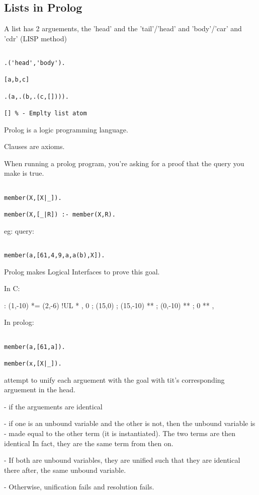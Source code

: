 \documentclass[a4paper,12pt]{article}
\begin{document}
\subsection{Lists in Prolog}

A list has 2 arguements, the 'head' and the 'tail'/'head' and 'body'/'car' and 'cdr' (LISP method) \\

\begin{verbatim}

.('head','body').

[a,b,c]

.(a,.(b,.(c,[]))).

[] % - Emplty list atom

\end{verbatim}

Prolog is a logic programming language.

Clauses are axioms.

When running a prolog program, you're asking for a proof that the query you make is true.

\begin{verbatim}

member(X,[X|_]).

member(X,[_|R]) :- member(X,R).

\end{verbatim}

eg: query:


\begin{verbatim}

member(a,[61,4,9,a,a(b),X]).

\end{verbatim}

Prolog makes Logical Interfaces to prove this goal.


In C:


\xy <1cm,0cm>:
(1,-10) *= (2,-6) !UL\txt{} *\frm{-} ,
0 ; (15,0) ; (15,-10) **\dir{-} ;
(0,-10) **\dir{-} ;
0 **\dir{-} ,
\endxy


In prolog:

\begin{verbatim}

member(a,[61,a]).
   
member(x,[X|_]).

\end{verbatim}

attempt to unify each arguement with the goal with tit's corresponding arguement in the head.

	- if the arguements are identical
	
	- if one is an unbound variable and the other is not, then the unbound variable is 
	- made equal to the other term (it is instantiated). The two terms are then identical
	  In fact, they are the same term from then on.

	- If both are unbound variables, they are unified such that they are identical there after,
	  the same unbound variable.

	- Otherwise, unification fails and resolution fails.
\end{document}
